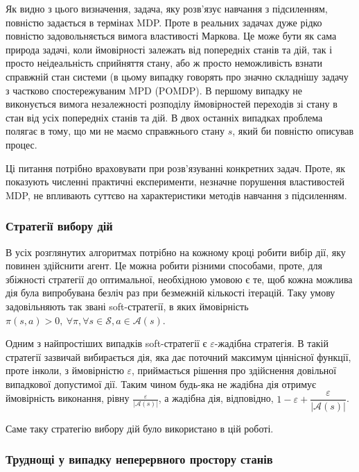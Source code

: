 \documentclass[a4paper,12pt]{article}
\begin{document}
Як видно з цього визначення, задача, яку розв'язує навчання з підсиленням, повністю задається в термінах MDP. Проте в реальних задачах дуже рідко повністю задовольняється вимога властивості Маркова. Це може бути як сама природа задачі, коли ймовірності залежать від попередніх станів та дій, так і просто неідеальність сприйняття стану, або ж просто неможливість взнати справжній стан системи (в цьому випадку говорять про значно складнішу задачу з частково спостережуваним MPD (POMDP). В першому випадку не виконується вимога незалежності розподілу ймовірностей переходів зі стану в стан від усіх попередніх станів та дій. В двох останніх випадках проблема полягає в тому, що ми не маємо справжнього стану $s$, який би повністю описував процес.

Ці питання потрібно враховувати при розв'язуванні конкретних задач. Проте, як показують численні практичні експерименти, незначне порушення властивостей MDP, не впливають суттєво на характеристики методів навчання з підсиленням.

\subsubsection{Стратегії вибору дій}
В усіх розглянутих алгоритмах потрібно на кожному кроці робити вибір дії, яку повинен здійснити агент. Це можна робити різними способами, проте, для збіжності стратегії до оптимальної, необхідною умовою є те, щоб кожна можлива дія була випробувана безліч раз при безмежній кількості ітерацій. Таку умову задовільняють так звані soft-стратегії, в яких ймовірність $\pi(s,a)>0,\ \forall \pi, \forall s \in \mathcal{S}, a \in \mathcal{A}(s)$.

Одним з найпростіших випадків soft-стратегії є $\varepsilon$-жадібна стратегія. В такій стратегії зазвичай вибирається дія, яка дає поточний максимум ціннісної функції, проте інколи, з ймовірністю $\varepsilon$, приймається рішення про здійснення довільної випадкової допустимої дії. Таким чином будь-яка не жадібна дія отримує ймовірність виконання, рівну $\frac{\varepsilon}{|\mathcal{A}(s)|}$, а жадібна дія, відповідно, $ 1 - \varepsilon + \dfrac{\varepsilon}{|\mathcal{A}(s)|}$.

Саме таку стратегію вибору дій було використано в цій роботі.

\subsubsection{Труднощі у випадку неперервного простору станів}
\end{document}
